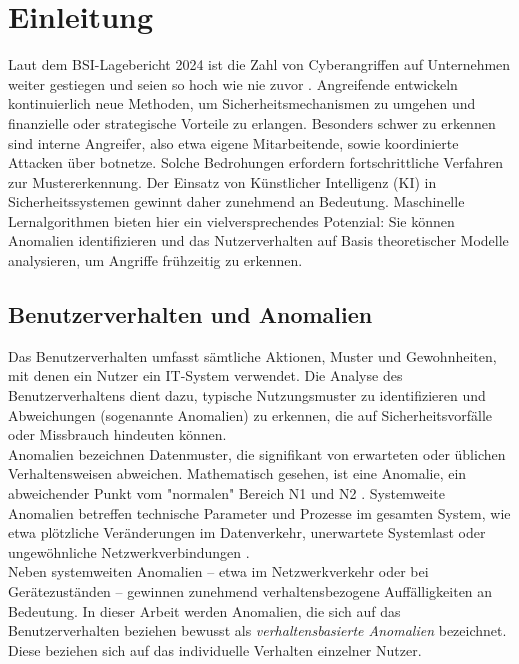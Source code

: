 \documentclass[a4paper,12pt]{article}
\begin{document}
	\printglossaries 
	\newpage

	\section{Einleitung}
	Laut dem BSI-Lagebericht 2024 ist die Zahl von Cyberangriffen auf Unternehmen weiter gestiegen und seien so hoch wie nie zuvor \cite{bsi2024lage}. Angreifende entwickeln kontinuierlich neue Methoden, um Sicherheitsmechanismen zu umgehen und finanzielle oder strategische Vorteile zu erlangen. Besonders schwer zu erkennen sind interne Angreifer, also etwa eigene Mitarbeitende, sowie koordinierte Attacken über \gls{botnetz}e. Solche Bedrohungen erfordern fortschrittliche Verfahren zur Mustererkennung. Der Einsatz von Künstlicher Intelligenz (KI) in Sicherheitssystemen gewinnt daher zunehmend an Bedeutung. Maschinelle Lernalgorithmen bieten hier ein vielversprechendes Potenzial: Sie können Anomalien identifizieren und das Nutzerverhalten auf Basis theoretischer Modelle analysieren, um Angriffe frühzeitig zu erkennen.
	
	\subsection{Benutzerverhalten und Anomalien}
	Das Benutzerverhalten umfasst sämtliche Aktionen, Muster und Gewohnheiten, mit denen ein Nutzer ein IT-System verwendet. Die Analyse des Benutzerverhaltens dient dazu, typische Nutzungsmuster zu identifizieren und Abweichungen (sogenannte Anomalien) zu erkennen, die auf Sicherheitsvorfälle oder Missbrauch hindeuten können.
	\\[0.5em]
	Anomalien bezeichnen Datenmuster, die signifikant von erwarteten oder üblichen Verhaltensweisen abweichen. Mathematisch gesehen, ist eine Anomalie, ein abweichender Punkt vom "normalen" Bereich N1 und N2 \cite[S.2]{chandola2009anomaly}. 
	Systemweite Anomalien betreffen technische Parameter und Prozesse im gesamten System, wie etwa plötzliche Veränderungen im Datenverkehr, unerwartete Systemlast oder ungewöhnliche Netzwerkverbindungen \cite[S.2]{chandola2009anomaly}.
	\\[0.5em]
	Neben systemweiten Anomalien – etwa im Netzwerkverkehr oder bei Gerätezuständen – gewinnen zunehmend verhaltensbezogene Auffälligkeiten an Bedeutung. In dieser Arbeit werden Anomalien, die sich auf das Benutzerverhalten beziehen bewusst als \textit{verhaltensbasierte Anomalien} bezeichnet. Diese beziehen sich auf das individuelle Verhalten einzelner Nutzer.
	
\end{document}
